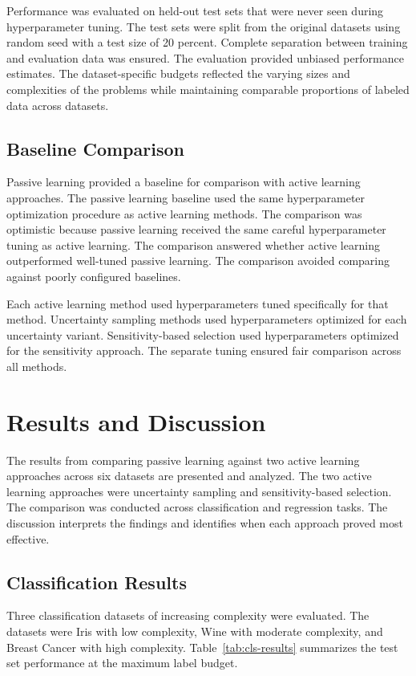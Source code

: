 \documentclass[conference]{IEEEtran}
\begin{document}
Performance was evaluated on held-out test sets that were never seen during hyperparameter tuning. The test sets were split from the original datasets using random seed with a test size of 20 percent. Complete separation between training and evaluation data was ensured. The evaluation provided unbiased performance estimates. The dataset-specific budgets reflected the varying sizes and complexities of the problems while maintaining comparable proportions of labeled data across datasets.

\subsection{Baseline Comparison}

Passive learning provided a baseline for comparison with active learning approaches. The passive learning baseline used the same hyperparameter optimization procedure as active learning methods. The comparison was optimistic because passive learning received the same careful hyperparameter tuning as active learning. The comparison answered whether active learning outperformed well-tuned passive learning. The comparison avoided comparing against poorly configured baselines.

Each active learning method used hyperparameters tuned specifically for that method. Uncertainty sampling methods used hyperparameters optimized for each uncertainty variant. Sensitivity-based selection used hyperparameters optimized for the sensitivity approach. The separate tuning ensured fair comparison across all methods.

\section{Results and Discussion}

The results from comparing passive learning against two active learning approaches across six datasets are presented and analyzed. The two active learning approaches were uncertainty sampling and sensitivity-based selection. The comparison was conducted across classification and regression tasks. The discussion interprets the findings and identifies when each approach proved most effective.

\subsection{Classification Results}

Three classification datasets of increasing complexity were evaluated. The datasets were Iris with low complexity, Wine with moderate complexity, and Breast Cancer with high complexity. Table~\ref{tab:cls-results} summarizes the test set performance at the maximum label budget.
\end{document}

